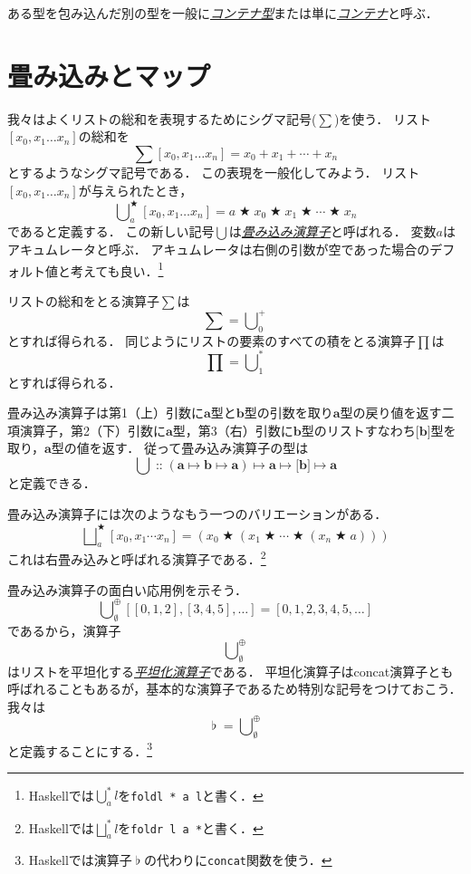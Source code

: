 \documentclass[twocolumn]{jsbook}
\newcommand{\keyword}[1]{\underline{\emph{#1}}}
\newcommand{\code}[1]{\texttt{#1}}
\newcommand{\hsklType}[1]{\textbf{#1}}
\DeclareMathOperator{\hsklConcat}{\flat}
\newcommand{\hsklAppend}{\oplus}
\newcommand{\hsklEmptyList}{\emptyset}
\newcommand{\hsklListType}[1]{\boldsymbol{[}#1\boldsymbol{]}}
\DeclareMathOperator{\mathAnyBinaryOperator}{\bigstar}
\DeclareMathOperator{\mathIn}{::}
\DeclareMathOperator*{\mathFold}{\bigcup}
\DeclareMathOperator*{\mathFoldRight}{\bigsqcup}
\DeclareMathOperator{\mathMapsTo}{\mapsto}
\newcommand{\mathMorphII}[3]{#1\mathMapsTo#2\mathMapsTo#3}
\newcommand{\mathMorphIII}[4]{#1\mathMapsTo#2\mathMapsTo#3\mathMapsTo#4}
\begin{document}
ある型を包み込んだ別の型を一般に\keyword{コンテナ型}または単に\keyword{コンテナ}と呼ぶ．

\section{畳み込みとマップ}

我々はよくリストの総和を表現するためにシグマ記号($\sum$)を使う．
リスト$[x_0,x_1\dots x_n]$の総和を$$\sum[x_0,x_1\dots x_n]=x_0+x_1+\dotsb+x_n$$とするようなシグマ記号である．
この表現を一般化してみよう．
リスト$[x_0,x_1\dots x_n]$が与えられたとき，$$\mathFold^{\mathAnyBinaryOperator}_{a}[x_0,x_1\dots x_n]=a\mathAnyBinaryOperator x_0\mathAnyBinaryOperator x_1\mathAnyBinaryOperator\dotsb\mathAnyBinaryOperator x_n$$であると定義する．
この新しい記号$\mathFold$は\keyword{畳み込み演算子}と呼ばれる．
変数$a$はアキュムレータと呼ぶ．
アキュムレータは右側の引数が空であった場合のデフォルト値と考えても良い．\footnote{Haskellでは$\mathFold^{*}_{a}l$を\code{foldl * a l}と書く．}

リストの総和をとる演算子$\sum$は$$\sum=\mathFold^+_0$$とすれば得られる．
同じようにリストの要素のすべての積をとる演算子$\prod$は$$\prod=\mathFold^*_1$$とすれば得られる．

畳み込み演算子は第1（上）引数に$\hsklType{a}$型と$\hsklType{b}$型の引数を取り$\hsklType{a}$型の戻り値を返す二項演算子，第2（下）引数に$\hsklType{a}$型，第3（右）引数に$\hsklType{b}$型のリストすなわち$\hsklListType{\hsklType{b}}$型を取り，$\hsklType{a}$型の値を返す．
従って畳み込み演算子の型は$$\mathFold\mathIn\mathMorphIII{(\mathMorphII{\hsklType{a}}{\hsklType{b}}{\hsklType{a}})}{\hsklType{a}}{\hsklListType{\hsklType{b}}}{\hsklType{a}}$$と定義できる．

畳み込み演算子には次のようなもう一つのバリエーションがある．
$$\mathFoldRight^{\mathAnyBinaryOperator}_{a}[x_0,x_1\dotsb x_n]=\left(x_0\mathAnyBinaryOperator\left(x_1\mathAnyBinaryOperator\dotsb\mathAnyBinaryOperator\left(x_n\mathAnyBinaryOperator a\right)\right)\right)$$
これは右畳み込みと呼ばれる演算子である．\footnote{Haskellでは$\mathFoldRight^{*}_{a}l$を\code{foldr l a *}と書く．}

畳み込み演算子の面白い応用例を示そう．
$$\mathFold_\hsklEmptyList^\hsklAppend[[0,1,2],[3,4,5],\dots]=[0,1,2,3,4,5,\dots]$$
であるから，演算子$$\mathFold_\hsklEmptyList^\hsklAppend$$はリストを平坦化する\keyword{平坦化演算子}である．
平坦化演算子はconcat演算子とも呼ばれることもあるが，基本的な演算子であるため特別な記号をつけておこう．
我々は$$\hsklConcat=\mathFold_\hsklEmptyList^\hsklAppend$$と定義することにする．\footnote{Haskellでは演算子$\hsklConcat$の代わりに\code{concat}関数を使う．}
\end{document}
